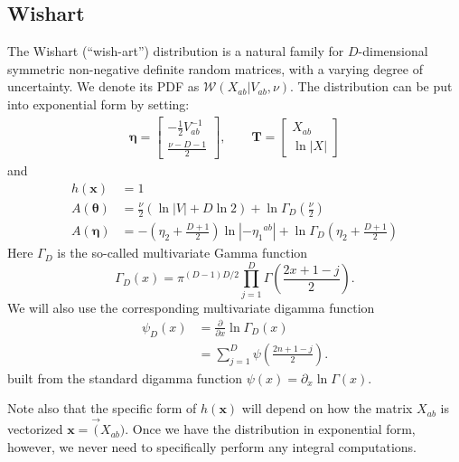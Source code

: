 \documentclass[aps,showpacs,twocolumn,prd,superscriptaddress,nofootinbib]{revtex4}
\newcommand{\be}{\begin{equation}}
\newcommand{\ee}{\end{equation}}
\begin{document}
\subsection{Wishart}
The Wishart (``wish-art'') distribution is a natural family for $D$-dimensional symmetric non-negative definite random matrices, with a varying degree of uncertainty. We denote its PDF as $\mathcal{W}(X_{ab}|V_{ab},\nu)$. The distribution can be put into exponential form by setting:
\begin{align*}
  \bm\eta=
\begin{bmatrix}
  -\frac12V^{-1}_{ab}\\[.7ex]
  \frac{\nu-D-1}2
\end{bmatrix},\qquad
\bm T=
\begin{bmatrix}
  X_{ab}\\[.7ex]
  \ln\left|X\right|
\end{bmatrix}
\end{align*}
and
\begin{align*}
h(\bm x)&=1\\
A(\bm\theta)&=\frac\nu2\left(\ln|V|+D\ln2\right)+\ln \Gamma_D\left(\frac\nu2\right)\\
A(\bm\eta)&=-\!\left(\eta_2+\frac{D+1}2\right)\ln\left|{-{\eta_1}^{ab}}\right|+\ln \Gamma_D\left(\eta_2+\frac{D+1}2\right)
\end{align*}
Here $\Gamma_D$ is the so-called multivariate Gamma function
\be
\Gamma_D\left(x\right)=\pi^{(D-1)D/2}\prod_{j=1}^D{\Gamma\left(\frac{2x+1-j}2\right)}. 
\ee
We will also use the corresponding multivariate digamma function
\begin{align}
\psi_D\left(x\right)&=\frac\partial{\partial x}\ln\Gamma_D\left(x\right)\\
&=\sum_{j=1}^D{\psi\left(\frac{2n+1-j}2\right)}. 
\end{align}
built from the standard digamma function $\psi(x)=\partial_x\ln\Gamma(x)$.

Note also that the specific form of $h(\bm x)$ will depend on how the matrix $X_{ab}$ is vectorized $\bm x=\vec(X_{ab})$.  Once we have the distribution in exponential form, however, we never need to specifically perform any integral computations.
\end{document}
